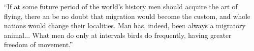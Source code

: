 % 

``If at some future period of the world's history men should acquire the art of flying, there an be no doubt that migration would become the custom, and whole nations would change their localities.  Man has, indeed, been always a migratory animal... What men do only at intervals birds do frequently, having greater freedom of movement.''
\\
